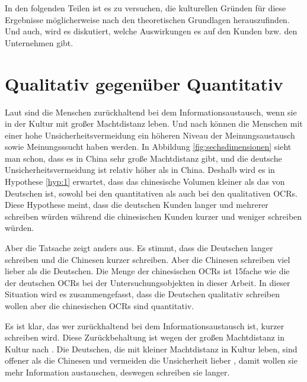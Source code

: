 In den folgenden Teilen ist es zu versuchen, die kulturellen Gründen für diese Ergebnisse möglicherweise nach den theoretischen Grundlagen herauszufinden. Und auch, wird es diskutiert, welche Auswirkungen es auf den Kunden \ac{bzw.} den Unternehmen gibt.
\section{Qualitativ gegenüber Quantitativ}
Laut \citet{Lam2009} sind die Menschen zurückhaltend bei dem Informationsaustausch, wenn sie in der Kultur mit großer Machtdistanz leben. Und nach \citet{Lam2009, liu2001relationships, dawar1996cross, money1998explorations} können die Menschen mit einer hohe Unsicherheitsvermeidung ein höheren Niveau der Meinungsaustausch sowie Meinungsssucht haben werden. In Abbildung \ref{fig:sechsdimensionen} sieht man schon, dass es in China sehr große Machtdistanz gibt, und die deutsche Unsicherheitsvermeidung ist relativ höher als in China. Deshalb wird es in Hypothese \ref{hyp:1} erwartet, dass das chinesische Volumen kleiner als das von Deutschen ist, sowohl bei den quantitativen als auch bei den qualitativen \ac{OCRs}. Diese Hypothese meint, dass die deutschen Kunden langer und mehrerer schreiben würden während die chinesischen Kunden kurzer und weniger schreiben würden.

Aber die Tatsache zeigt anders aus. Es stimmt, dass die Deutschen langer schreiben und die Chinesen kurzer schreiben. Aber die Chinesen schreiben viel lieber als die Deutschen. Die Menge der chinesischen \ac{OCRs} ist 15fache wie die der deutschen \ac{OCRs} bei der Untersuchungsobjekten in dieser Arbeit. In dieser Situation wird es zusammengefasst, dass die Deutschen qualitativ schreiben wollen aber die chinesischen \ac{OCRs} sind quantitativ.

Es ist klar, das wer zurückhaltend bei dem Informationsaustausch ist, kurzer schreiben wird. Diese Zurückbehaltung ist wegen der großen Machtdistanz in Kultur nach \citet{Lam2009}. Die Deutschen, die mit kleiner Machtdistanz in Kultur leben, sind offener als die Chinesen und vermeiden die Unsicherheit lieber \citep{Lam2009, liu2001relationships, dawar1996cross, money1998explorations}, damit wollen sie mehr Information austauschen, deswegen schreiben sie langer.

